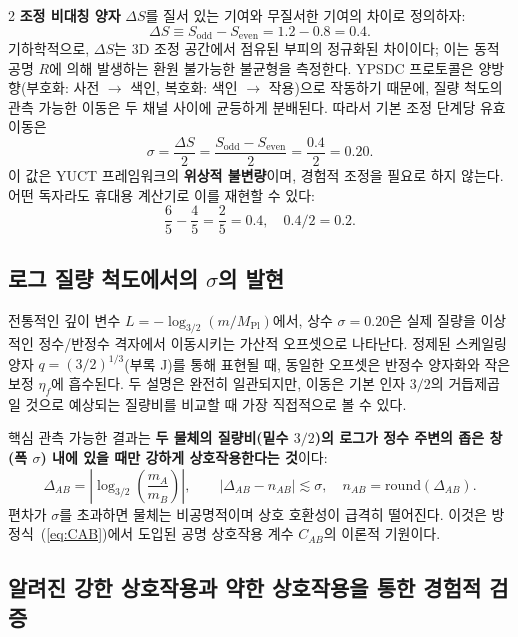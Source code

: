 \documentclass[11pt,a4paper]{article}
\begin{document}
\begin{multicols}{2}
		\textbf{조정 비대칭 양자} \(\Delta S\)를 질서 있는 기여와 무질서한 기여의 차이로 정의하자:
		\begin{equation}
			\Delta S \equiv S_{\mathrm{odd}} - S_{\mathrm{even}} = 1.2 - 0.8 = 0.4.
			\label{eq:Deltas}
		\end{equation}
		기하학적으로, \(\Delta S\)는 3D 조정 공간에서 점유된 부피의 정규화된 차이이다; 이는 동적 공명 \(R\)에 의해 발생하는 환원 불가능한 불균형을 측정한다. YPSDC 프로토콜은 양방향(부호화: 사전 \(\to\) 색인, 복호화: 색인 \(\to\) 작용)으로 작동하기 때문에, 질량 척도의 관측 가능한 이동은 두 채널 사이에 균등하게 분배된다. 따라서 기본 조정 단계당 유효 이동은
		\begin{equation}
			\boxed{\sigma = \frac{\Delta S}{2} = \frac{S_{\mathrm{odd}} - S_{\mathrm{even}}}{2} = \frac{0.4}{2} = 0.20.}
			\label{eq:sigma}
		\end{equation}
		이 값은 YUCT 프레임워크의 \textbf{위상적 불변량}이며, 경험적 조정을 필요로 하지 않는다. 어떤 독자라도 휴대용 계산기로 이를 재현할 수 있다:
		\[
		\frac{6}{5} - \frac{4}{5} = \frac{2}{5} = 0.4,\quad 0.4 / 2 = 0.2.
		\]
		
		\subsection{로그 질량 척도에서의 \(\sigma\)의 발현}
		
		전통적인 깊이 변수 \(L = -\log_{3/2}(m/M_{\mathrm{Pl}})\)에서, 상수 \(\sigma = 0.20\)은 실제 질량을 이상적인 정수/반정수 격자에서 이동시키는 가산적 오프셋으로 나타난다. 정제된 스케일링 양자 \(q = (3/2)^{1/3}\)(부록 J)를 통해 표현될 때, 동일한 오프셋은 반정수 양자화와 작은 보정 \(\eta_f\)에 흡수된다. 두 설명은 완전히 일관되지만, 이동은 기본 인자 \(3/2\)의 거듭제곱일 것으로 예상되는 질량비를 비교할 때 가장 직접적으로 볼 수 있다.
		
		핵심 관측 가능한 결과는 \textbf{두 물체의 질량비(밑수 \(3/2\))의 로그가 정수 주변의 좁은 창(폭 $\sigma$) 내에 있을 때만 강하게 상호작용한다는 것}이다:
		\[
		\Delta_{AB} = \left| \log_{3/2}\left( \frac{m_A}{m_B} \right) \right|,\qquad
		|\Delta_{AB} - n_{AB}| \lesssim \sigma,\quad n_{AB} = \text{round}(\Delta_{AB}).
		\]
		편차가 $\sigma$를 초과하면 물체는 비공명적이며 상호 호환성이 급격히 떨어진다. 이것은 방정식~(\ref{eq:CAB})에서 도입된 공명 상호작용 계수 \(C_{AB}\)의 이론적 기원이다.
		
		\subsection{알려진 강한 상호작용과 약한 상호작용을 통한 경험적 검증}
		

\end{multicols}
\end{document}
